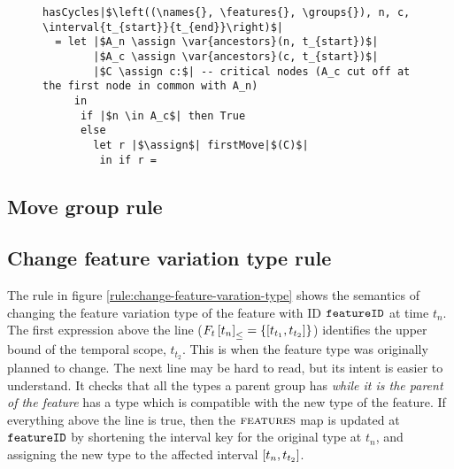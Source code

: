 \begin{figure}
  \begin{verbatim}
hasCycles|$\left((\names{}, \features{}, \groups{}), n, c, \interval{t_{start}}{t_{end}}\right)$|
  = let |$A_n \assign \var{ancestors}(n, t_{start})$|
        |$A_c \assign \var{ancestors}(c, t_{start})$|
        |$C \assign c:$| -- critical nodes (A_c cut off at the first node in common with A_n)
     in
      if |$n \in A_c$| then True
      else 
        let r |$\assign$| firstMove|$(C)$|
         in if r = 
  \end{verbatim}
  \caption{\label{fun:has-cycles}}
\end{figure}

\subsection{Move group rule}
\label{sub:move-group-rule}


\subsection{Change feature variation type rule}
\label{sub:change-feature-variation-type-rule}
The rule in figure \vref{rule:change-feature-varation-type} shows the semantics of changing the feature variation type of the feature with ID $\texttt{featureID}$ at time $t_n$. The first expression above the line ($\containing{F_t}{t_n} = \set{\interval{t_{t_1}}{t_{t_2}}}$) identifies the upper bound of the temporal scope, $t_{t_2}$. This is when the feature type was originally planned to change. The next line may be hard to read, but its intent is easier to understand. It checks that all the types a parent group has \emph{while it is the parent of the feature} has a type which is compatible with the new type of the feature. If everything above the line is true, then the $\textsc{features}{}$ map is updated at $\texttt{featureID}$ by shortening the interval key for the original type at $t_n$, and assigning the new type to the affected interval $\interval{t_n}{t_{t_2}}$. 


